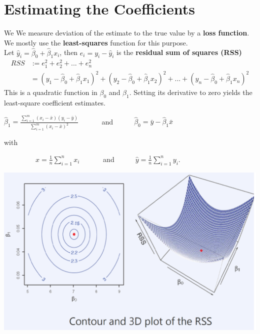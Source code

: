 	\section{Estimating the Coefficients}
		We We measure deviation of the estimate to the true value by a \textbf{loss function}.
		We mostly use the \textbf{least-squares} function for this purpose.\\
		Let $\hat{y}_i = \hat{\beta}_0 + \hat{\beta}_1 x_i$, then $e_i = y_i - \hat{y}_i$ is the 
		\textbf{residual sum of squares (RSS)}
		\begin{align*}
			RSS &:= e^2_1 + e^2_2 + ... + e^2_n\\
			&= (y_1 - \hat{\beta}_0 + \hat{\beta}_1 x_1)^2 + (y_2 - \hat{\beta}_0 + \hat{\beta}_1 x_2)^2
			+ ... + (y_n - \hat{\beta}_0 + \hat{\beta}_1 x_n)^2
		\end{align*}
		This is a quadratic function in $\beta_0$ and $\beta_1$.
		Setting its derivative to zero yields the least-square coefficient estimates.
		\begin{center}
			$\hat{\beta}_1 = \frac{\sum\limits_{i=1}^m (x_i-\bar{x})(y_i-\bar{y})}{\sum\limits_{i=1}^m (x_i-\bar{x})^2}$
			\ \ \ \ \ \ and\ \ \ \ \ \ 
			$\hat{\beta}_0 = \bar{y} - \hat{\beta}_1\bar{x}$
		\end{center}
		with
		\begin{center}
			\ \ \ \ \ \ \ \ \ 
			$\hat{x} = \frac{1}{n} \sum\limits_{i=1}^n x_i$
			\ \ \ \ \ \ and\ \ \ \ \ \ 
			$\hat{y} = \frac{1}{n} \sum\limits_{i=1}^n y_i$.
		\end{center}
		\includegraphics[width=1.05\linewidth]{Graphics/LinearRegression/1.png}
	
	
